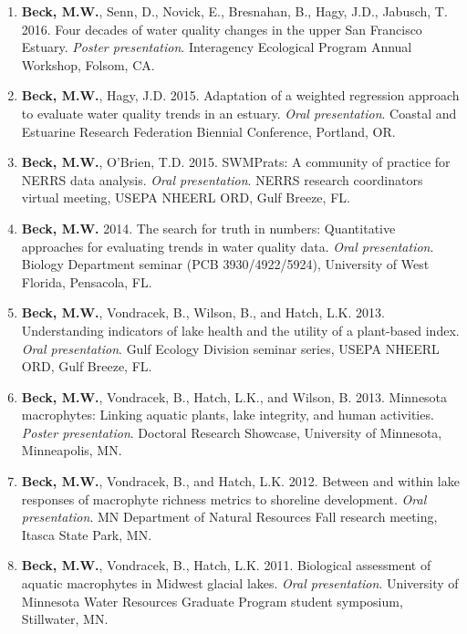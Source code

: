 \documentclass[letterpaper,12pt]{article}
\begin{document}
\begin{enumerate}
\item {\bf Beck, M.W.}, Senn, D., Novick, E., Bresnahan, B., Hagy, J.D., Jabusch, T. 2016. Four decades of water quality changes in the upper San Francisco Estuary. \textit{Poster presentation}. Interagency Ecological Program Annual Workshop, Folsom, CA.

\item {\bf Beck, M.W.}, Hagy, J.D. 2015. Adaptation of a weighted regression approach to evaluate water quality trends in an estuary. \textit{Oral presentation}. Coastal and Estuarine Research Federation Biennial Conference, Portland, OR.

\item {\bf Beck, M.W.}, O'Brien, T.D. 2015. SWMPrats: A community of practice for NERRS data analysis. \textit{Oral presentation}. NERRS research coordinators virtual meeting, USEPA NHEERL ORD, Gulf Breeze, FL.

\item {\bf Beck, M.W.} 2014. The search for truth in numbers: Quantitative approaches for evaluating trends in water quality data. \textit{Oral presentation}. Biology Department seminar (PCB 3930/4922/5924), University of West Florida, Pensacola, FL. 

\item {\bf Beck, M.W.}, Vondracek, B., Wilson, B., and Hatch, L.K. 2013. Understanding indicators of lake health and the utility of a plant-based index. \textit{Oral presentation}. Gulf Ecology Division seminar series, USEPA NHEERL ORD, Gulf Breeze, FL.

\item {\bf Beck, M.W.}, Vondracek, B., Hatch, L.K., and Wilson, B. 2013. Minnesota macrophytes: Linking aquatic plants, lake integrity, and human activities. \textit{Poster presentation}. Doctoral Research Showcase, University of Minnesota, Minneapolis, MN.

\item {\bf Beck, M.W.}, Vondracek, B., and Hatch, L.K. 2012. Between and within lake responses of macrophyte richness metrics to shoreline development. \textit{Oral presentation}. MN Department of Natural Resources Fall research meeting, Itasca State Park, MN.

\item {\bf Beck, M.W.}, Vondracek, B., Hatch, L.K. 2011. Biological assessment of aquatic macrophytes in Midwest glacial lakes. \textit{Oral presentation}. University of Minnesota Water Resources Graduate Program student symposium, Stillwater, MN.


\end{enumerate}
\end{document}
